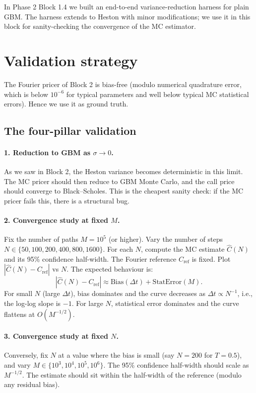 \documentclass[11pt]{article}
\theoremstyle{plain}
\theoremstyle{definition}
\theoremstyle{remark}
\begin{document}
In Phase 2 Block 1.4 we built an end-to-end variance-reduction harness for plain GBM. The harness extends to Heston with minor modifications; we use it in this block for sanity-checking the convergence of the MC estimator.

\section{Validation strategy}

The Fourier pricer of Block 2 is bias-free (modulo numerical quadrature error, which is below $10^{-6}$ for typical parameters and well below typical MC statistical errors). Hence we use it as ground truth.

\subsection{The four-pillar validation}

\paragraph{1. Reduction to GBM as $\sigma \to 0$.} As we saw in Block 2, the Heston variance becomes deterministic in this limit. The MC pricer should then reduce to GBM Monte Carlo, and the call price should converge to Black--Scholes. This is the cheapest sanity check: if the MC pricer fails this, there is a structural bug.

\paragraph{2. Convergence study at fixed $M$.} Fix the number of paths $M = 10^5$ (or higher). Vary the number of steps $N \in \{50, 100, 200, 400, 800, 1600\}$. For each $N$, compute the MC estimate $\widehat C(N)$ and its 95\% confidence half-width. The Fourier reference $C_{\mathrm{ref}}$ is fixed. Plot $|\widehat C(N) - C_{\mathrm{ref}}|$ vs $N$. The expected behaviour is:
\[
    |\widehat C(N) - C_{\mathrm{ref}}| \approx \mathrm{Bias}(\Delta t) + \mathrm{StatError}(M).
\]
For small $N$ (large $\Delta t$), bias dominates and the curve decreases as $\Delta t \propto N^{-1}$, i.e., the log-log slope is $-1$. For large $N$, statistical error dominates and the curve flattens at $O(M^{-1/2})$.

\paragraph{3. Convergence study at fixed $N$.} Conversely, fix $N$ at a value where the bias is small (say $N = 200$ for $T = 0.5$), and vary $M \in \{10^3, 10^4, 10^5, 10^6\}$. The 95\% confidence half-width should scale as $M^{-1/2}$. The estimate should sit within the half-width of the reference (modulo any residual bias).
\end{document}
